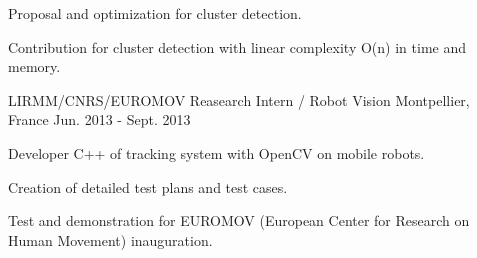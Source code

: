 \begin{cventries}
{\begin{cvitems}
       \item {Proposal and optimization for cluster detection.}
       \item {Contribution for cluster detection with linear complexity O(n) in time and memory.}
      \end{cvitems}
    }
    \cventry
    {LIRMM/CNRS/EUROMOV}
    {Reasearch Intern / Robot Vision}
    {Montpellier, France}
    {Jun. 2013 - Sept. 2013}
    {
      \begin{cvitems}
       \item{Developer C++ of tracking system with OpenCV on mobile robots.}
       \item {Creation of detailed test plans and test cases.}
       \item {Test and demonstration for EUROMOV (European Center for Research on Human Movement) inauguration.}
      \end{cvitems}
    }
\end{cventries}

